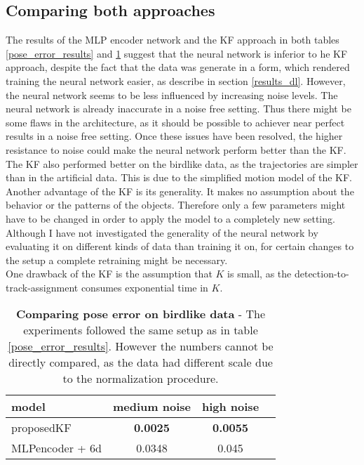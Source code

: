 \documentclass{article}
\begin{document}
\subsection{Comparing both approaches}
\label{comparison}
The results of the MLP encoder network and the KF approach in both tables \ref{pose_error_results} and \ref{table_KF_vs_NN} suggest that the neural network is inferior to he KF approach, despite the fact that the data was generate in a form, which rendered training the neural network  easier, as describe in section \ref{results_dl}. However, the neural network seems to be less influenced by increasing noise levels. The neural network is already inaccurate in a noise free setting. Thus there might be some flaws in the architecture, as it should be possible to achiever near perfect results in a noise free setting. Once these issues have been resolved, the higher resistance to noise could make the neural network perform better than the KF. \\
The KF also performed better on the birdlike data, as the trajectories are simpler than in the artificial data. This is due to the simplified motion model of the KF. \\
Another advantage of the KF is its generality. It makes no assumption about the behavior or the patterns of the objects. Therefore only a few parameters might have to be changed in order to apply the model to a completely new setting. Although I have not investigated the generality of the neural network by evaluating it on different kinds of data than training it on, for certain changes to the setup a complete retraining might be necessary. \\
One drawback of the KF is the assumption that $K$ is small, as the detection-to-track-assignment consumes exponential time in $K$.

\begin{table}[h!]
	\centering
	\begin{tabular}{|l |c| c| c|} 
		\hline
		model &  medium noise & high noise \\ \hline
		\hline
		proposedKF &  \textbf{0.0025} & \textbf{0.0055} \\ \hline
		MLPencoder + 6d &  0.0348 & 0.045 \\ 
		\hline
	\end{tabular}\\
	\bigskip
	\caption{\textbf{Comparing pose error on birdlike data} -  The experiments followed the same setup as in table \ref{pose_error_results}. However the numbers cannot be directly compared, as the data had different scale due to the normalization procedure.}
	\label{table_KF_vs_NN}
\end{table}
\end{document}
